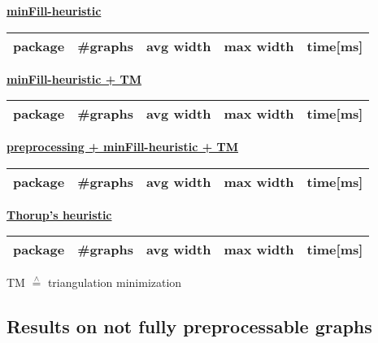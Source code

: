 \documentclass[a4wide]{article}
\begin{document}
\begin{minipage}{0.2\textwidth}
\underline{\textbf{minFill-heuristic}} \\
\small{
\begin{tabular}{|l|l|l|l|l|}
\hline
package & \#graphs & avg width & max width & time[ms] \\
\hline
\hline

\hline
\end{tabular}
}
\end{minipage}
\hspace{6.5cm}
\begin{minipage}{0.2\textwidth}
\underline{\textbf{minFill-heuristic + TM}} \\
\small{
\begin{tabular}{|l|l|l|l|l|}
\hline
package & \#graphs & avg width & max width & time[ms] \\
\hline
\hline

\hline
\end{tabular}
}
\end{minipage}

\vspace*{0.5cm}

\begin{minipage}{0.2\textwidth}
\underline{\textbf{preprocessing + minFill-heuristic + TM}} \\
\small{
\begin{tabular}{|l|l|l|l|l|}
\hline
package & \#graphs & avg width & max width & time[ms] \\
\hline
\hline

\hline
\end{tabular}
}
\end{minipage}
\hspace{6.5cm}
\begin{minipage}{0.2\textwidth}
\underline{\textbf{Thorup's heuristic}} \\
\small{
\begin{tabular}{|l|l|l|l|l|}
\hline
package & \#graphs & avg width & max width & time[ms] \\
\hline
\hline

\hline
\end{tabular}
}
\end{minipage}

\vspace*{0.5cm}

TM $\overset{\wedge}{=}$ triangulation minimization \\ 

\newpage

\subsection{Results on not fully preprocessable graphs}
\end{document}
